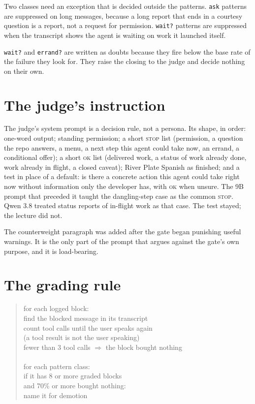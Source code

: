 Two classes need an exception that is decided outside the patterns.
\texttt{ask} patterns are suppressed on long messages, because a long report
that ends in a courtesy question is a report, not a request for permission.
\texttt{wait?} patterns are suppressed when the transcript shows the agent is
waiting on work it launched itself.

\texttt{wait?} and \texttt{errand?} are written as doubts because they fire
below the base rate of the failure they look for. They raise the closing to
the judge and decide nothing on their own.

\section{The judge's instruction}
\label{app:prompt}

The judge's system prompt is a decision rule, not a persona. Its shape, in
order: one-word output; standing permission; a short \textsc{stop} list
(permission, a question the repo answers, a menu, a next step this agent
could take now, an errand, a conditional offer); a short \textsc{ok} list
(delivered work, a status of work already done, work already in flight, a
closed caveat); River Plate Spanish as finished; and a test in place of a
default: is there a concrete action this agent could take right now without
information only the developer has, with \textsc{ok} when unsure. The 9B
prompt that preceded it taught the dangling-step case as the common
\textsc{stop}. Qwen 3.8 treated status reports of in-flight work as that
case. The test stayed; the lecture did not.

The counterweight paragraph was added after the gate began punishing useful
warnings. It is the only part of the prompt that argues against the gate's own
purpose, and it is load-bearing.

\section{The grading rule}
\label{app:grading}

\begin{quote}
\ttfamily\small
for each logged block:\\
\hspace*{2em}find the blocked message in its transcript\\
\hspace*{2em}count tool calls until the user speaks again\\
\hspace*{2em}(a tool result is not the user speaking)\\
\hspace*{2em}fewer than 3 tool calls $\Rightarrow$ the block bought nothing\\
\\
for each pattern class:\\
\hspace*{2em}if it has 8 or more graded blocks\\
\hspace*{2em}and 70\% or more bought nothing:\\
\hspace*{4em}name it for demotion
\end{quote}

